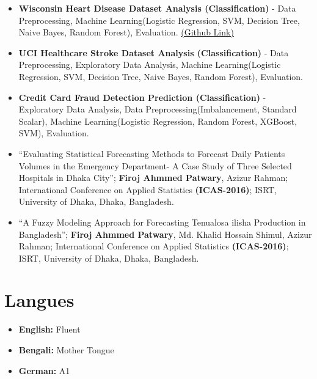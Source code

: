 \documentclass[11pt,a4paper,sans]{moderncv}
\begin{document}
\begin{itemize}

\item  \textbf{Wisconsin Heart Disease Dataset Analysis (Classification)} - Data Preprocessing, Machine Learning(Logistic Regression, SVM, Decision Tree, Naive Bayes, Random Forest), Evaluation. \href{www.firoj.net}{(Github Link)}

\vspace{3pt}

\item \textbf{UCI Healthcare Stroke Dataset Analysis (Classification)} - Data Preprocessing, Exploratory Data Analysis, Machine Learning(Logistic Regression, SVM, Decision Tree, Naive Bayes, Random Forest), Evaluation.

\vspace{3pt}

\item \textbf{Credit Card Fraud Detection Prediction (Classification)} - Exploratory Data Analysis, Data Preprocessing(Imbalancement, Standard Scalar), Machine Learning(Logistic Regression, Random Forest, XGBoost, SVM), Evaluation.

\vspace{3pt}

\item “Evaluating Statistical Forecasting Methods to Forecast Daily Patients Volumes in the Emergency Department- A Case Study of Three Selected Hospitals in Dhaka City”; \textbf{Firoj Ahmmed Patwary}, Azizur Rahman; International Conference on Applied Statistics \textbf{(ICAS-2016)}; ISRT, University of Dhaka, Dhaka, Bangladesh.


\vspace{3pt}

\item “A Fuzzy Modeling Approach for Forecasting Tenualosa ilisha Production in Bangladesh”; \textbf{Firoj Ahmmed Patwary}, Md. Khalid Hossain Shimul, Azizur Rahman; International Conference on Applied Statistics \textbf{(ICAS-2016)}; ISRT, University of Dhaka, Dhaka, Bangladesh.

\end{itemize}


\vspace{2pt}

\section{Langues}

\vspace{1pt}

\begin{itemize}

\item \textbf{English:} Fluent

\vspace{1pt}

\item \textbf{Bengali:} Mother Tongue

\vspace{1pt}

\item \textbf{German:} A1
\vspace{1pt}


\end{itemize}


\nocite{*}

                       
\end{document}
